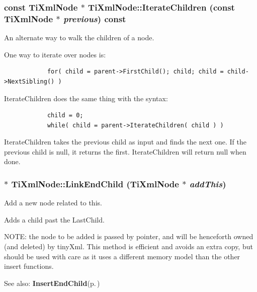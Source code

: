 \subsubsection{\setlength{\rightskip}{0pt plus 5cm}const {\bf Ti\-Xml\-Node} $\ast$ Ti\-Xml\-Node::Iterate\-Children (const {\bf Ti\-Xml\-Node} $\ast$ {\em previous}) const\hspace{0.3cm}{\tt  [inherited]}}\label{classTiXmlNode_TiXmlUnknowna26}


An alternate way to walk the children of a node. 

One way to iterate over nodes is: 

\footnotesize\begin{verbatim}
			for( child = parent->FirstChild(); child; child = child->NextSibling() )
		\end{verbatim}
\normalsize


Iterate\-Children does the same thing with the syntax: 

\footnotesize\begin{verbatim}
			child = 0;
			while( child = parent->IterateChildren( child ) )
		\end{verbatim}
\normalsize


Iterate\-Children takes the previous child as input and finds the next one. If the previous child is null, it returns the first. Iterate\-Children will return null when done.
\subsubsection{ $\ast$ Ti\-Xml\-Node::Link\-End\-Child ({\bf Ti\-Xml\-Node} $\ast$ {\em add\-This})\hspace{0.3cm}{\tt  [inherited]}}\label{classTiXmlNode_TiXmlUnknowna33}


Add a new node related to this. 

Adds a child past the Last\-Child.

NOTE: the node to be added is passed by pointer, and will be henceforth owned (and deleted) by tiny\-Xml. This method is efficient and avoids an extra copy, but should be used with care as it uses a different memory model than the other insert functions.

\begin{Desc}
\item[See also:]{\bf Insert\-End\-Child}{\rm (p.\,\pageref{classTiXmlNode_TiXmlUnknowna32})}\end{Desc}
